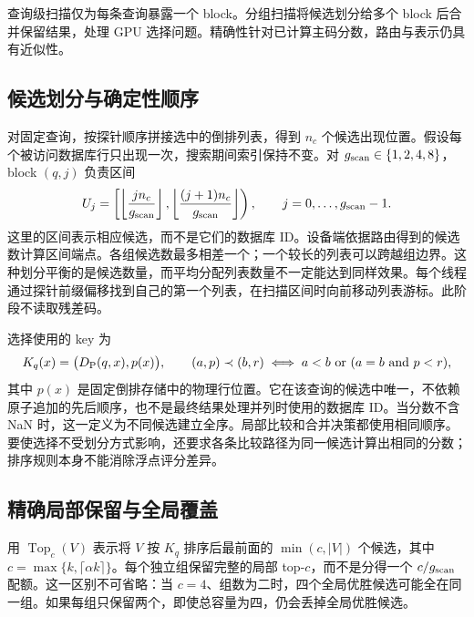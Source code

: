 查询级扫描仅为每条查询暴露一个 block。分组扫描将候选划分给多个 block 后合并保留结果，处理 GPU 选择问题\cite{johnson_gpu}。精确性针对已计算主码分数，路由与表示仍具有近似性。

\subsection{候选划分与确定性顺序}

对固定查询，按探针顺序拼接选中的倒排列表，得到 $n_c$ 个候选出现位置。假设每个被访问数据库行只出现一次，搜索期间索引保持不变。对 $g_{\mathrm{scan}}\in\{1,2,4,8\}$，block $(q,j)$ 负责区间
\begin{equation}
 U_j=\left[\left\lfloor\frac{j n_c}{g_{\mathrm{scan}}}\right\rfloor,
              \left\lfloor\frac{(j+1)n_c}{g_{\mathrm{scan}}}\right\rfloor\right),
 \qquad j=0,\ldots,g_{\mathrm{scan}}-1.
 \label{eq:5-partition}
\end{equation}
这里的区间表示相应候选，而不是它们的数据库 ID。设备端依据路由得到的候选数计算区间端点。各组候选数最多相差一个；一个较长的列表可以跨越组边界。这种划分平衡的是候选数量，而平均分配列表数量不一定能达到同样效果。每个线程通过探针前缀偏移找到自己的第一个列表，在扫描区间时向前移动列表游标。此阶段不读取残差码。

选择使用的 key 为
\begin{equation}
 K_q(x)=\bigl(D_{\mathrm{P}}(q,x),p(x)\bigr),
 \qquad
 (a,p)\prec(b,r)\iff a<b\ \text{or}\ (a=b\ \text{and}\ p<r),
 \label{eq:5-primary-key}
\end{equation}
其中 $p(x)$ 是固定倒排存储中的物理行位置。它在该查询的候选中唯一，不依赖原子追加的先后顺序，也不是最终结果处理并列时使用的数据库 ID。当分数不含 NaN 时，这一定义为不同候选建立全序。局部比较和合并决策都使用相同顺序。要使选择不受划分方式影响，还要求各条比较路径为同一候选计算出相同的分数；排序规则本身不能消除浮点评分差异。

\subsection{精确局部保留与全局覆盖}

用 $\operatorname{Top}_c(V)$ 表示将 $V$ 按 $K_q$ 排序后最前面的 $\min(c,|V|)$ 个候选，其中 $c=\max\{k,\lceil\alpha k\rceil\}$。每个独立组保留完整的局部 top-$c$，而不是分得一个 $c/g_{\mathrm{scan}}$ 配额。这一区别不可省略：当 $c=4$、组数为二时，四个全局优胜候选可能全在同一组。如果每组只保留两个，即使总容量为四，仍会丢掉全局优胜候选。

